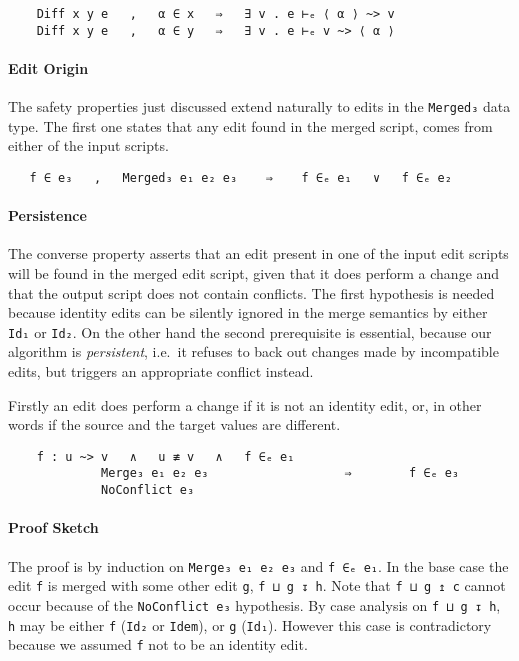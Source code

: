 \documentclass[preprint]{sigplanconf}
\begin{document}
\begin{verbatim}
    Diff x y e   ,   α ∈ x   ⇒   ∃ v . e ⊢ₑ ⟨ α ⟩ ~> v
    Diff x y e   ,   α ∈ y   ⇒   ∃ v . e ⊢ₑ v ~> ⟨ α ⟩
\end{verbatim}
 
    \paragraph{Edit Origin}
    The safety properties just discussed extend naturally to edits in the 
    \texttt{Merged₃} data type.
    The first one states that any edit found in the merged script,
    comes from either of the input scripts.
\begin{verbatim}
   f ∈ e₃   ,   Merged₃ e₁ e₂ e₃    ⇒    f ∈ₑ e₁   ∨   f ∈ₑ e₂
\end{verbatim}
    
    \paragraph{Persistence}
    The converse property asserts that an edit present in one of the input
    edit scripts will be found in the merged edit script, given that it does
    perform a change and that the output script does not contain conflicts.
    The first hypothesis is needed because identity edits can be silently 
    ignored in the merge semantics by either \texttt{Id₁} or
    \texttt{Id₂}.
    On the other hand the second prerequisite is essential, because 
    our algorithm is \emph{persistent}, i.e.\ it refuses to back out changes 
    made by incompatible edits, but triggers an appropriate conflict instead.

    Firstly an edit does perform a change if it is not an identity edit, or, in 
    other words if the source and the target values are different.
				
\begin{verbatim}
    f : u ~> v   ∧   u ≢ v   ∧   f ∈ₑ e₁
             Merge₃ e₁ e₂ e₃                   ⇒        f ∈ₑ e₃
             NoConflict e₃ 
\end{verbatim}
    \paragraph{Proof Sketch}
    The proof is by induction on \texttt{Merge₃ e₁ e₂ e₃} and \texttt{f ∈ₑ e₁}.
    In the base case the edit \texttt{f} is merged with some other edit \texttt{g},
    \texttt{f ⊔ g ↧ h}. Note that \texttt{f ⊔ g ↥ c} cannot occur because of
    the \texttt{NoConflict e₃} hypothesis. By case analysis on \texttt{f ⊔ g ↧ h},
    \texttt{h} may be either \texttt{f} (\texttt{Id₂} or \texttt{Idem}), or 
    \texttt{g} (\texttt{Id₁}). However this case is contradictory because we
    assumed \texttt{f} not to be an identity edit.
    
\end{document}
